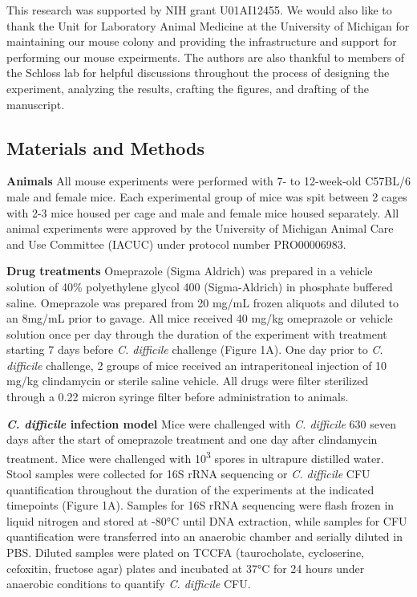\documentclass[11pt,]{article}
\begin{document}
This research was supported by NIH grant U01AI12455. We would also like
to thank the Unit for Laboratory Animal Medicine at the University of
Michigan for maintaining our mouse colony and providing the
infrastructure and support for performing our mouse expeirments. The
authors are also thankful to members of the Schloss lab for helpful
discussions throughout the process of designing the experiment,
analyzing the results, crafting the figures, and drafting of the
manuscript.

\newpage

\subsection{Materials and Methods}\label{materials-and-methods}

\textbf{Animals} All mouse experiments were performed with 7- to
12-week-old C57BL/6 male and female mice. Each experimental group of
mice was spit between 2 cages with 2-3 mice housed per cage and male and
female mice housed separately. All animal experiments were approved by
the University of Michigan Animal Care and Use Committee (IACUC) under
protocol number PRO00006983.

\textbf{Drug treatments} Omeprazole (Sigma Aldrich) was prepared in a
vehicle solution of 40\% polyethylene glycol 400 (Sigma-Aldrich) in
phosphate buffered saline. Omeprazole was prepared from 20 mg/mL frozen
aliquots and diluted to an 8mg/mL prior to gavage. All mice received 40
mg/kg omeprazole or vehicle solution once per day through the duration
of the experiment with treatment starting 7 days before \emph{C.
difficile} challenge (Figure 1A). One day prior to \emph{C. difficile}
challenge, 2 groups of mice received an intraperitoneal injection of 10
mg/kg clindamycin or sterile saline vehicle. All drugs were filter
sterilized through a 0.22 micron syringe filter before administration to
animals.

\textbf{\emph{C. difficile} infection model} Mice were challenged with
\emph{C. difficile} 630 seven days after the start of omeprazole
treatment and one day after clindamycin treatment. Mice were challenged
with 10\textsuperscript{3} spores in ultrapure distilled water. Stool
samples were collected for 16S rRNA sequencing or \emph{C. difficile}
CFU quantification throughout the duration of the experiments at the
indicated timepoints (Figure 1A). Samples for 16S rRNA sequencing were
flash frozen in liquid nitrogen and stored at -80°C until DNA
extraction, while samples for CFU quantification were transferred into
an anaerobic chamber and serially diluted in PBS. Diluted samples were
plated on TCCFA (taurocholate, cycloserine, cefoxitin, fructose agar)
plates and incubated at 37°C for 24 hours under anaerobic conditions to
quantify \emph{C. difficile} CFU.
\end{document}
